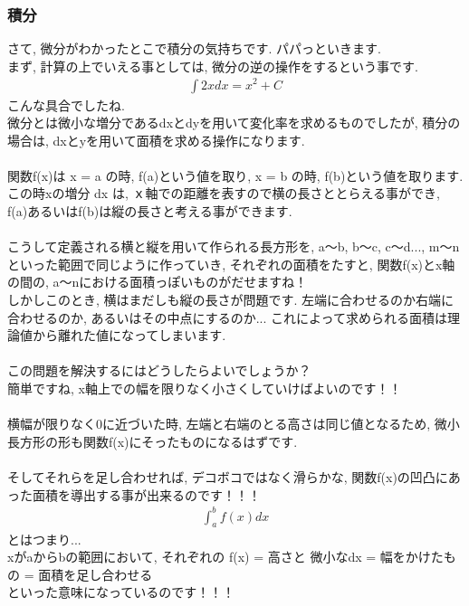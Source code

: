 \documentclass[11pt,a4paper]{jsarticle}
\begin{document}
\subsubsection{積分}
さて, 微分がわかったとこで積分の気持ちです. パパっといきます.\\
まず, 計算の上でいえる事としては, 微分の逆の操作をするという事です.
\begin{eqnarray}
\int 2x dx= x^2 + C
\end{eqnarray}
こんな具合でしたね. \\
微分とは微小な増分であるdxとdyを用いて変化率を求めるものでしたが, 積分の場合は, dxとyを用いて面積を求める操作になります.\\
\\
関数f(x)は x = a の時, f(a)という値を取り, x = b の時, f(b)という値を取ります. この時xの増分 dx は, ｘ軸での距離を表すので横の長さととらえる事ができ, f(a)あるいはf(b)は縦の長さと考える事ができます.\\
\\
こうして定義される横と縦を用いて作られる長方形を, a～b, b～c, c～d..., m～nといった範囲で同じように作っていき, それぞれの面積をたすと, 関数f(x)とx軸の間の, a～nにおける面積っぽいものがだせますね！\\
しかしこのとき, 横はまだしも縦の長さが問題です. 左端に合わせるのか右端に合わせるのか, あるいはその中点にするのか... これによって求められる面積は理論値から離れた値になってしまいます.\\
\\
この問題を解決するにはどうしたらよいでしょうか？\\
簡単ですね, x軸上での幅を限りなく小さくしていけばよいのです！！\\
\\
横幅が限りなく0に近づいた時, 左端と右端のとる高さは同じ値となるため, 微小長方形の形も関数f(x)にそったものになるはずです.\\
\\
そしてそれらを足し合わせれば, デコボコではなく滑らかな, 関数f(x)の凹凸にあった面積を導出する事が出来るのです！！！
\begin{eqnarray}
\int_a^b f(x) dx
\end{eqnarray}
とはつまり...\\
xがaからbの範囲において, それぞれの f(x) = 高さと 微小なdx = 幅をかけたもの = 面積を足し合わせる\\
といった意味になっているのです！！！\\
\end{document}
